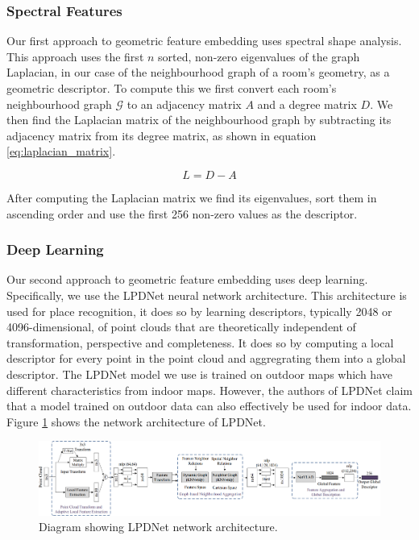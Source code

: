 \subsubsection{Spectral Features}
Our first approach to geometric feature embedding uses spectral shape analysis. This approach uses the first \(n\) sorted, non-zero eigenvalues of the graph Laplacian, in our case of the neighbourhood graph of a room's geometry, as a geometric descriptor. To compute this we first convert each room's neighbourhood graph \(\mathcal{G}\) to an adjacency matrix \(A\) and a degree matrix \(D\). We then find the Laplacian matrix of the neighbourhood graph by subtracting its adjacency matrix from its degree matrix, as shown in equation \ref{eq:laplacian_matrix}.

\begin{equation}
    \label{eq:laplacian_matrix}
L = D - A
\end{equation}

After computing the Laplacian matrix we find its eigenvalues, sort them in ascending order and use the first 256 non-zero values as the descriptor. 


\subsubsection{Deep Learning}
Our second approach to geometric feature embedding uses deep learning. Specifically, we use the LPDNet neural network architecture. This architecture is used for place recognition, it does so by learning descriptors, typically 2048 or 4096-dimensional, of point clouds that are theoretically independent of transformation, perspective and completeness. It does so by computing a local descriptor for every point in the point cloud and aggregrating them into a global descriptor. The LPDNet model we use is trained on outdoor maps which have different characteristics from indoor maps. However, the authors of LPDNet claim that a model trained on outdoor data can also effectively be used for indoor data. Figure \ref{fig:lpdnet_architecture} shows the network architecture of LPDNet.


\begin{figure}[h]
    \centering
    \includegraphics*[width=\textwidth]{./fig/network_architecture.png}
    \caption{Diagram showing LPDNet network architecture.}
    \label{fig:lpdnet_architecture}
\end{figure}

